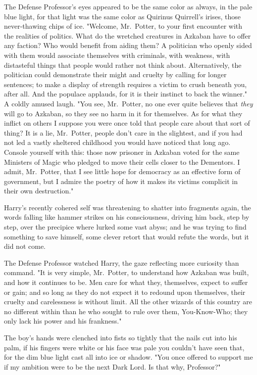 The Defense Professor's eyes appeared to be the same color as always, in the
pale blue light, for that light was the same color as Quirinus Quirrell's
irises, those never-thawing chips of ice. "Welcome, Mr.~Potter, to your first
encounter with the realities of politics. What do the wretched creatures in
Azkaban have to offer any faction? Who would benefit from aiding them? A
politician who openly sided with them would associate themselves with
criminals, with weakness, with distasteful things that people would rather not
think about. Alternatively, the politician could demonstrate their might and
cruelty by calling for longer sentences; to make a display of strength requires
a victim to crush beneath you, after all. And the populace applauds, for it is
their instinct to back the winner." A coldly amused laugh. "You see,
Mr.~Potter, no one ever quite believes that \emph{they} will go to Azkaban, so
they see no harm in it for themselves. As for what they inflict on
others{\el} I suppose you were once told that people care about that sort of
thing? It is a lie, Mr.~Potter, people don't care in the slightest, and if you
had not led a vastly sheltered childhood you would have noticed that long ago.
Console yourself with this: those now prisoner in Azkaban voted for the same
Ministers of Magic who pledged to move their cells closer to the Dementors. I
admit, Mr.~Potter, that I see little hope for democracy as an effective form of
government, but I admire the poetry of how it makes its victims complicit in
their own destruction."

Harry's recently cohered self was threatening to shatter into fragments again,
the words falling like hammer strikes on his consciousness, driving him back,
step by step, over the precipice where lurked some vast abyss; and he was
trying to find something to save himself, some clever retort that would refute
the words, but it did not come.

The Defense Professor watched Harry, the gaze reflecting more curiosity than
command. "It is very simple, Mr.~Potter, to understand how Azkaban was built,
and how it continues to be. Men care for what they, themselves, expect to
suffer or gain; and so long as they do not expect it to redound upon
themselves, their cruelty and carelessness is without limit. All the other
wizards of this country are no different within than he who sought to rule over
them, You-Know-Who; they only lack his power and his{\el} frankness."

The boy's hands were clenched into fists so tightly that the nails cut into his
palm, if his fingers were white or his face was pale you couldn't have seen
that, for the dim blue light cast all into ice or shadow. "You once offered to
support me if my ambition were to be the next Dark Lord. Is that why,
Professor?"

